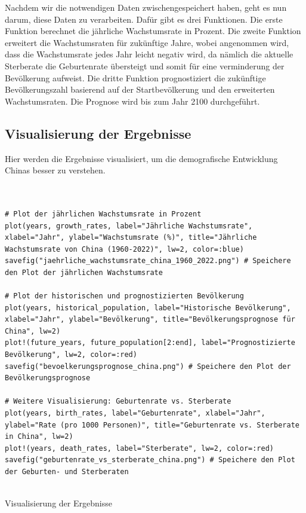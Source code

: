 Nachdem wir die notwendigen Daten zwischengespeichert haben, geht es nun darum, diese Daten zu verarbeiten. Dafür gibt es drei Funktionen. Die erste Funktion berechnet die jährliche Wachstumsrate in Prozent. Die zweite Funktion erweitert die Wachstumsraten für zukünftige Jahre, wobei angenommen wird, dass die Wachstumsrate jedes Jahr leicht negativ wird, da nämlich die aktuelle Sterberate die Geburtenrate übersteigt und somit für eine verminderung der Bevölkerung aufweist. Die dritte Funktion prognostiziert die zukünftige Bevölkerungszahl basierend auf der Startbevölkerung und den erweiterten Wachstumsraten. Die Prognose wird bis zum Jahr 2100 durchgeführt.


\subsection{Visualisierung der Ergebnisse}
Hier werden die Ergebnisse visualisiert, um die demografische Entwicklung Chinas besser zu verstehen.

\begin{listing}[H]
\begin{verbatim}
    

# Plot der jährlichen Wachstumsrate in Prozent
plot(years, growth_rates, label="Jährliche Wachstumsrate", xlabel="Jahr", ylabel="Wachstumsrate (%)", title="Jährliche Wachstumsrate von China (1960-2022)", lw=2, color=:blue)
savefig("jaehrliche_wachstumsrate_china_1960_2022.png") # Speichere den Plot der jährlichen Wachstumsrate

# Plot der historischen und prognostizierten Bevölkerung
plot(years, historical_population, label="Historische Bevölkerung", xlabel="Jahr", ylabel="Bevölkerung", title="Bevölkerungsprognose für China", lw=2)
plot!(future_years, future_population[2:end], label="Prognostizierte Bevölkerung", lw=2, color=:red)
savefig("bevoelkerungsprognose_china.png") # Speichere den Plot der Bevölkerungsprognose

# Weitere Visualisierung: Geburtenrate vs. Sterberate
plot(years, birth_rates, label="Geburtenrate", xlabel="Jahr", ylabel="Rate (pro 1000 Personen)", title="Geburtenrate vs. Sterberate in China", lw=2)
plot!(years, death_rates, label="Sterberate", lw=2, color=:red)
savefig("geburtenrate_vs_sterberate_china.png") # Speichere den Plot der Geburten- und Sterberaten    
    
\end{verbatim}
\caption{Visualisierung der Ergebnisse}
\end{listing}


